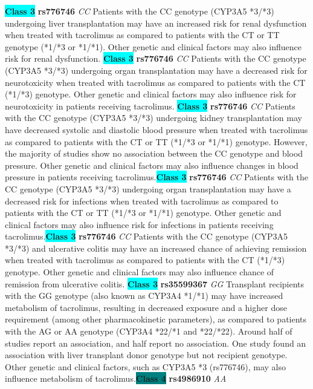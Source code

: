 \documentclass{report}
\begin{document}
\textbf{\colorbox{cyan} {Class 3}} \textbf{ rs776746 } \textit{ CC }
Patients with the CC genotype (CYP3A5 *3/*3) undergoing liver transplantation may have an increased risk for renal dysfunction when treated with tacrolimus as compared to patients with the CT or TT genotype (*1/*3 or *1/*1). Other genetic and clinical factors may also influence risk for renal dysfunction. \newline\textbf{\colorbox{cyan} {Class 3}} \textbf{ rs776746 } \textit{ CC }
Patients with the CC genotype (CYP3A5 *3/*3) undergoing organ transplantation may have a decreased risk for neurotoxicity when treated with tacrolimus as compared to patients with the CT (*1/*3) genotype. Other genetic and clinical factors may also influence risk for neurotoxicity in patients receiving tacrolimus. \newline\textbf{\colorbox{cyan} {Class 3}} \textbf{ rs776746 } \textit{ CC }
Patients with the CC genotype (CYP3A5 *3/*3) undergoing kidney transplantation may have decreased systolic and diastolic blood pressure when treated with tacrolimus as compared to patients with the CT or TT (*1/*3 or *1/*1) genotype. However, the majority of studies show no association between the CC genotype and blood pressure. Other genetic and clinical factors may also influence changes in blood pressure in patients receiving tacrolimus.\newline\textbf{\colorbox{cyan} {Class 3}} \textbf{ rs776746 } \textit{ CC }
Patients with the CC genotype (CYP3A5 *3/*3) undergoing organ transplantation may have a decreased risk for infections when treated with tacrolimus as compared to patients with the CT or TT (*1/*3 or *1/*1) genotype. Other genetic and clinical factors may also influence risk for infections in patients receiving tacrolimus.\newline\textbf{\colorbox{cyan} {Class 3}} \textbf{ rs776746 } \textit{ CC }
Patients with the CC genotype (CYP3A5 *3/*3) and ulcerative colitis may have an increased chance of achieving remission when treated with tacrolimus as compared to patients with the CT (*1/*3) genotype. Other genetic and clinical factors may also influence chance of remission from ulcerative colitis. \newline\textbf{\colorbox{cyan} {Class 3}} \textbf{ rs35599367 } \textit{ GG }
Transplant recipients with the GG genotype (also known as CYP3A4 *1/*1) may have increased metabolism of tacrolimus, resulting in decreased exposure and a higher dose requirement (among other pharmacokinetic parameters), as compared to patients with the AG or AA genotype (CYP3A4 *22/*1 and *22/*22). Around half of studies report an association, and half report no association. One study found an association with liver transplant donor genotype but not recipient genotype. Other genetic and clinical factors, such as CYP3A5 *3 (rs776746), may also influence metabolism of tacrolimus.\newline\textbf{\colorbox{teal} {Class 4}} \textbf{ rs4986910 } \textit{ AA }
\end{document}
